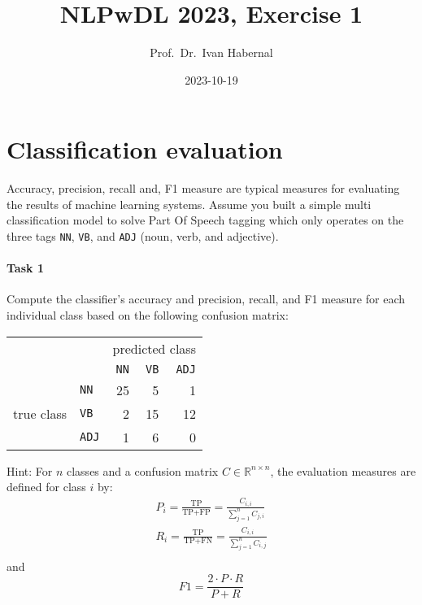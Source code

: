 \documentclass[11pt,a4wide,oneside]{article}
\title{NLPwDL 2023, Exercise 1}
\author{Prof.\ Dr.\ Ivan Habernal}
\date{2023-10-19}
\begin{document}
\maketitle

\section{Classification evaluation}

Accuracy, precision, recall and, F1 measure are typical measures for evaluating the results of machine learning systems.
Assume you built a simple multi classification model to solve Part Of Speech tagging which only operates on the three tags \texttt{NN}, \texttt{VB}, and \texttt{ADJ} (noun, verb, and adjective).


\paragraph{Task 1}
Compute the classifier's accuracy and precision, recall, and F1 measure for each individual class based on the following confusion matrix:
\begin{table}[h]
	\centering
	\begin{tabular}{ll|rrr}
		&				& \multicolumn{3}{c}{predicted class} \\
		&				& \texttt{NN}	& \texttt{VB}	& \texttt{ADJ} \\
		\cline{2-5}
		& \texttt{NN}	& 25			& 5				& 1 \\
		true class		& \texttt{VB}	& 2				& 15			& 12 \\
		& \texttt{ADJ}	& 1				& 6				& 0 \\
	\end{tabular}
\end{table}

Hint: For $n$ classes and a confusion matrix $C \in \mathbb{R}^{n \times n}$, the evaluation measures are defined for class $i$ by:
\begin{align*}
	P_i = \frac{\text{TP}}{\text{TP+FP}} = \frac{C_{i,i}}{\sum_{j=1}^n C_{j,i}} \\
	R_i = \frac{\text{TP}}{\text{TP+FN}} = \frac{C_{i,i}}{\sum_{j=1}^n C_{i,j}} \\
\end{align*}
and
\[\mathit{F1} = \frac{2 \cdot P \cdot R}{P + R}\]
\end{document}
